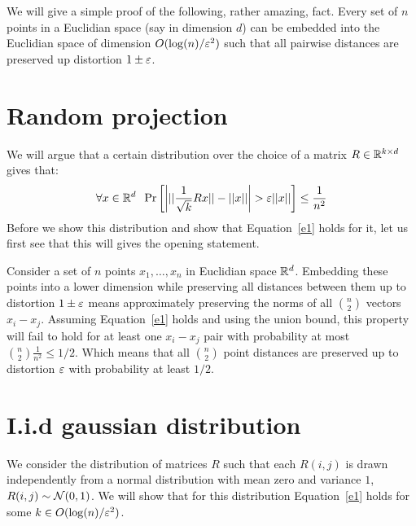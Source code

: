 \documentclass{article}
\begin{document}


We will give a simple proof of the following, rather amazing, fact. Every set of $n$ points 
in a Euclidian space (say in dimension $d$) can be embedded into the Euclidian space of 
dimension $O(\log(n)/\varepsilon^2)$ such that all pairwise distances are preserved up distortion $1\pm \varepsilon$.

\section*{Random projection}
We will argue that a certain distribution over the choice of a matrix $R \in {\mathbb{R}}^{k \times d}$ gives that:
\begin{equation}
\label{e1}
\forall x \in {\mathbb{R}}^{d} \;\; \Pr\left[ \left| ||\frac{1}{\sqrt{k}}Rx|| - ||x|| \right| > \varepsilon||x|| \right] \le \frac{1}{n^2} 
\end{equation}
Before we show this distribution and show that Equation~\ref{e1} holds for it, let us first see
that this will gives the opening statement. 

Consider a set of $n$ points $x_1,\ldots, x_n$ in Euclidian space ${\mathbb{R}}^d$. Embedding these points
into a lower dimension while preserving all distances between
them up to distortion $1\pm \varepsilon$ means approximately preserving the norms of all 
${n \choose 2}$ vectors $x_i - x_j$. Assuming Equation~\ref{e1} holds and using the union 
bound, this property will fail to hold for at least one $x_i - x_j$ pair with probability at most ${n \choose 2}\frac{1}{n^2} \le 1/2$.
Which means that all ${n \choose 2}$ point distances are preserved up to distortion $\varepsilon$ with probability at least $1/2$.


\section{I.i.d gaussian distribution}
We consider the distribution of matrices $R$ such that each $R(i,j)$ is drawn independently from  a
normal distribution with mean zero and variance $1$, $R(i,j) \sim {\mathcal{N}}(0,1)$. We will show that for this
distribution Equation~\ref{e1} holds for some $k \in O(\log(n)/\varepsilon^2)$.
\end{document}
